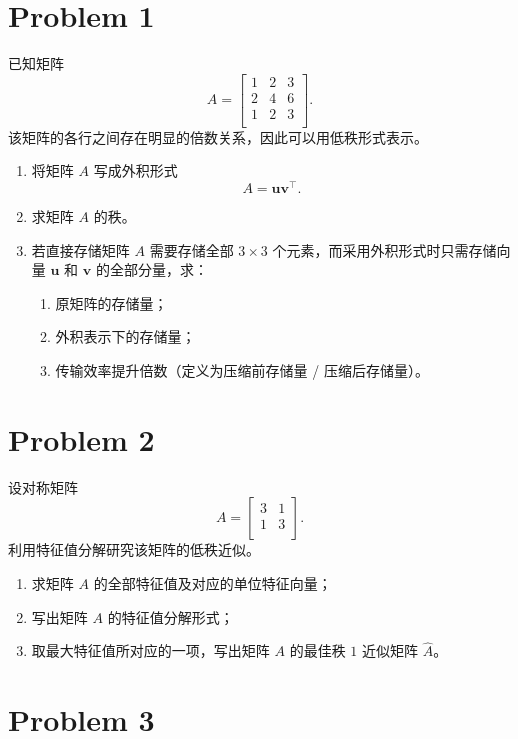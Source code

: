 \section*{Problem 1}

已知矩阵 \[
A = \begin{bmatrix}
1 & 2 & 3 \\
2 & 4 & 6 \\
1 & 2 & 3 \\
\end{bmatrix}.
\]
该矩阵的各行之间存在明显的倍数关系，因此可以用低秩形式表示。

\begin{enumerate}
    \item 将矩阵 $A$ 写成外积形式 \[A = \boldsymbol{u}\boldsymbol{v}^\top.\]
    \item 求矩阵 $A$ 的秩。
    \item 若直接存储矩阵 $A$ 需要存储全部 $3 \times 3$ 个元素，而采用外积形式时只需存储向量 $\boldsymbol{u}$ 和 $\boldsymbol{v}$ 的全部分量，求：
    \begin{enumerate}
        \item 原矩阵的存储量；
        \item 外积表示下的存储量；
        \item 传输效率提升倍数（定义为压缩前存储量 / 压缩后存储量）。
    \end{enumerate}
\end{enumerate}

\section*{Problem 2}

设对称矩阵 \[
A = \begin{bmatrix}
    3 & 1 \\
    1 & 3 \\
\end{bmatrix}.
\]
利用特征值分解研究该矩阵的低秩近似。

\begin{enumerate}
    \item 求矩阵 $A$ 的全部特征值及对应的单位特征向量；
    \item 写出矩阵 $A$ 的特征值分解形式；
    \item 取最大特征值所对应的一项，写出矩阵 $A$ 的最佳秩 $1$ 近似矩阵 $\hat{A}$。
\end{enumerate}

\section*{Problem 3}

